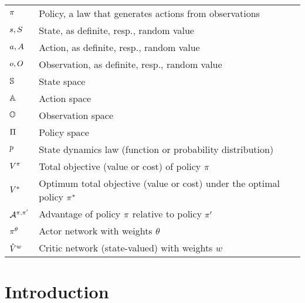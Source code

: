 \documentclass[12pt,twoside]{../../mitthesis}
\begin{document}
\noindent
\begin{tabularx}{0.97\textwidth}{ |p{}|p{}| }  
\hline
$\pi$ & Policy, a law that generates actions from observations \\ 
$s, S$ & State, as definite, resp., random value \\ 
$a, A$ & Action, as definite, resp., random value \\ 
$o, O$ & Observation, as definite, resp., random value \\ 
$\mathbb S$ & State space \\
$\mathbb A$ & Action space \\
$\mathbb O$ & Observation space \\
$\Pi$ & Policy space \\
$p$ & State dynamics law (function or probability distribution) \\ 
$V^\pi$ & Total objective (value or cost) of policy $\pi$ \\
$V^*$ & Optimum total objective (value or cost) under the optimal policy $\pi^*$ \\
$\mathcal A^{\pi,\pi'}$ & Advantage of policy $\pi$ relative to policy $\pi'$ \\
$\pi^\theta$ & Actor network with weights $\theta$ \\
$\hat {V}^w$ & Critic network (state-valued) with weights $w$ \\
\hline
\end{tabularx}

\section{Introduction}
\end{document}

